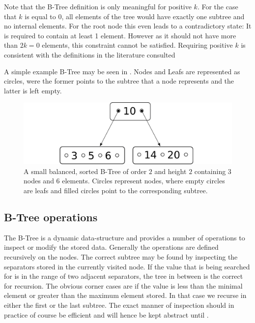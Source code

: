Note that the B-Tree definition is only meaningful for positive $k$.
For the case that $k$ is equal to 0,
all elements of the tree would have exactly one subtree
and no internal elements.
For the root node this even leads to a contradictory state:
It is required to contain at least 1 element.
However as it should not have more than $2k = 0$ elements,
this constraint cannot be satisfied.
Requiring positive $k$ is consistent with the definitions
in the literature consulted \parencite{DBLP:journals/acta/BayerM72,DBLP:journals/csur/Comer79,DBLP:books/daglib/0023376}

A simple example B-Tree may be seen in .
Nodes and Leafs are represented as circles, were the former points to the
subtree that a node represents and the latter is left empty.

\begin{figure}
    \centering
    \includegraphics[width=0.5\linewidth]{figures/btree-basic-nopair.pdf}
    \caption[A small example B-Tree]{A small balanced, sorted B-Tree of order $2$ and
    height $2$ containing $3$ nodes and $6$ elements.
    Circles represent nodes, where empty circles are leafs and filled circles
    point to the corresponding subtree.}
    \label{fig:btree-basic-nopair}
\end{figure}

\subsection{B-Tree operations}

The B-Tree is a dynamic data-structure and provides
a number of operations to inspect or modify the stored data.
Generally the operations are defined recursively on the nodes.
The correct subtree may be found by inspecting the separators stored
in the currently visited node.
If the value that is being searched for is in the range of two
adjacent separators, the tree in between is the correct for recursion. 
The obvious corner cases are if the value is less than the
minimal element or greater than the maximum element stored.
In that case we recurse in either the first or the last subtree.
The exact manner of inspection should in practice of course
be efficient and will hence be kept abstract until .

